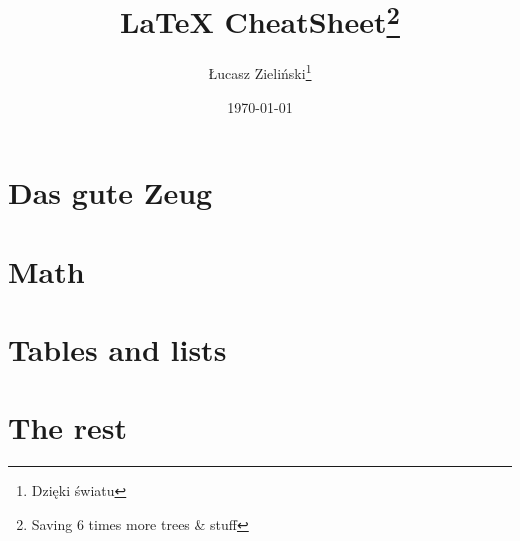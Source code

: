 \documentclass[11pt,a4paper]{report}
\title{\LaTeX{} CheatSheet\footnote{Saving 6 times more trees \& stuff}}
\author{Łucasz Zieliński\thanks{Dzięki światu}}
\date{\today}
\theoremstyle{plain} %
\theoremstyle{definition}
\begin{document}


\chapter{Das gute Zeug}












\pagestyle{plain}
\chapter{Math}\label{math}








\chapter{Tables and lists}



\chapter{The rest}




\end{document}
